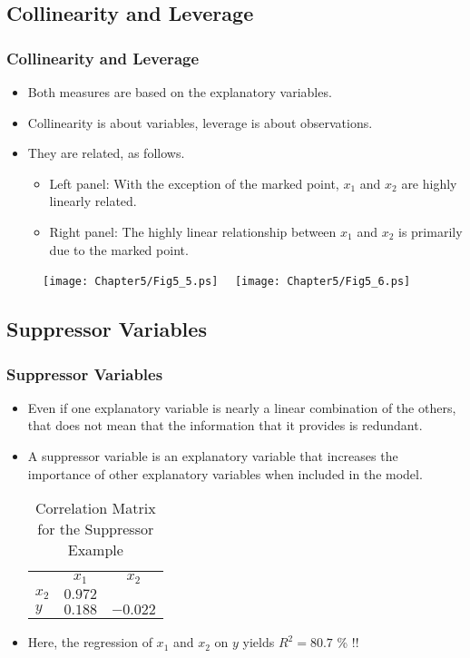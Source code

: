 \subsection{Collinearity and Leverage}

\begin{frame}[shrink=2]
 \frametitle{Collinearity and Leverage}
 \begin{itemize}
   \item Both measures are based on the explanatory variables.
 \item Collinearity is about variables, leverage is about observations.
 \item They are related, as follows.
  \begin{itemize}
   \item Left panel: With the exception of
the marked point, $x_1$ and $x_2$ are highly linearly related.
\item Right panel: The highly linear relationship
between $x_1$ and $x_2$ is primarily due to the marked point.
    \end{itemize}  \end{itemize}
\begin{figure}[htp]
    \texttt{[image: Chapter5/Fig5\_5.ps]}
    $~~~$
    \texttt{[image: Chapter5/Fig5\_6.ps]}    \hfill
\end{figure}

\end{frame}
\subsection{Suppressor Variables}


\begin{frame}%
 \frametitle{Suppressor Variables}
 \begin{itemize}
 \item Even if one explanatory variable is nearly a linear combination of
the others, that does not mean that the information that it provides
is redundant.
   \item A
suppressor variable is an explanatory variable that increases the
importance of other explanatory variables when included in the
model.
\begin{table}[h]

\caption{ Correlation Matrix for the Suppressor Example }

\begin{tabular}{ccc}
\hline
& $x_{1}$ & $x_{2}$ \\
\multicolumn{1}{l}{$x_{2}$} & $0.972$ &  \\
\multicolumn{1}{l}{$y$} & $0.188$ & $-0.022$ \\ \hline
\end{tabular}
\end{table}
\item Here, the regression of $x_1$ and $x_2$ on $y$ yields $R^2 = 80.7$ \% !!
    \end{itemize}
\end{frame}

